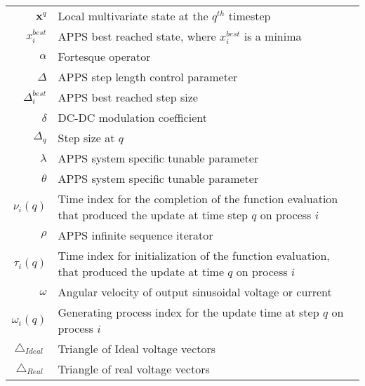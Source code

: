 \begin{scriptsize}
\begin{tabularx}{\textwidth}{r|X}
$\textbf{x}^{q}$                           & Local multivariate state at the $q^{th}$ timestep\\
$x_i^{best}$											& APPS best reached state, where $x_i^{best}$ is a minima\\
$\alpha$													& Fortesque operator\\
$\Delta$													& APPS step length control parameter\\
$\Delta_i^{best}$											& APPS best reached step size\\
$\delta$                    & DC-DC modulation coefficient\\
$\Delta_q$                        & Step size at $q$\\
$\lambda$                   & APPS system specific tunable parameter\\
$\theta$                    & APPS system specific tunable parameter\\
$\nu_i(q)$ 												& Time index for the completion of the function evaluation that produced the update at time step $q$ on process $i$\\
$\rho$																& APPS infinite sequence iterator\\
$\tau_i(q)$												& Time index for initialization of the function evaluation, that produced the update at time $q$ on process $i$\\
$\omega$													& Angular velocity of output sinusoidal voltage or current\\
$\omega_i(q)$ 										& Generating process index for the update time at step $q$ on process $i$\\
$\bigtriangleup_{Ideal}$          & Triangle of Ideal voltage vectors\\
  $\bigtriangleup_{Real}$           & Triangle of real voltage vectors\\


\end{tabularx}
\end{scriptsize}
